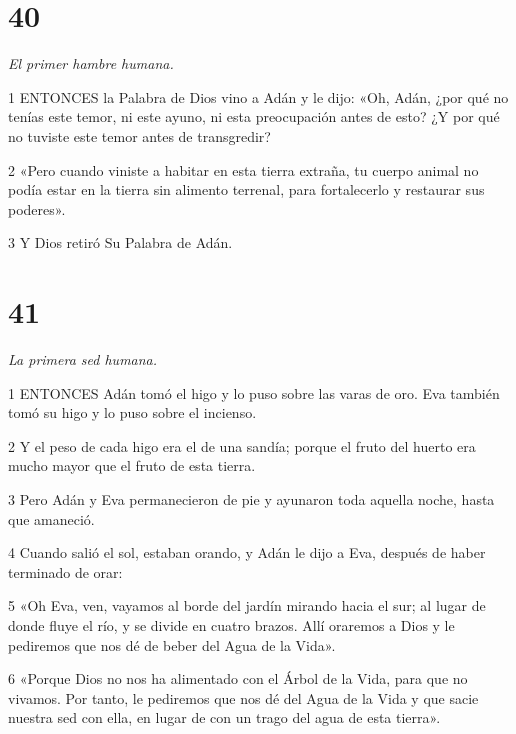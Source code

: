 \chapter{40}

\par \textit{El primer hambre humana.}

\par 1 ENTONCES la Palabra de Dios vino a Adán y le dijo: «Oh, Adán, ¿por qué no tenías este temor, ni este ayuno, ni esta preocupación antes de esto? ¿Y por qué no tuviste este temor antes de transgredir?

\par 2 «Pero cuando viniste a habitar en esta tierra extraña, tu cuerpo animal no podía estar en la tierra sin alimento terrenal, para fortalecerlo y restaurar sus poderes».

\par 3 Y Dios retiró Su Palabra de Adán.

\chapter{41}

\par \textit{La primera sed humana.}

\par 1 ENTONCES Adán tomó el higo y lo puso sobre las varas de oro. Eva también tomó su higo y lo puso sobre el incienso.

\par 2 Y el peso de cada higo era el de una sandía; porque el fruto del huerto era mucho mayor que el fruto de esta tierra.

\par 3 Pero Adán y Eva permanecieron de pie y ayunaron toda aquella noche, hasta que amaneció.

\par 4 Cuando salió el sol, estaban orando, y Adán le dijo a Eva, después de haber terminado de orar:

\par 5 «Oh Eva, ven, vayamos al borde del jardín mirando hacia el sur; al lugar de donde fluye el río, y se divide en cuatro brazos. Allí oraremos a Dios y le pediremos que nos dé de beber del Agua de la Vida».

\par 6 «Porque Dios no nos ha alimentado con el Árbol de la Vida, para que no vivamos. Por tanto, le pediremos que nos dé del Agua de la Vida y que sacie nuestra sed con ella, en lugar de con un trago del agua de esta tierra».

